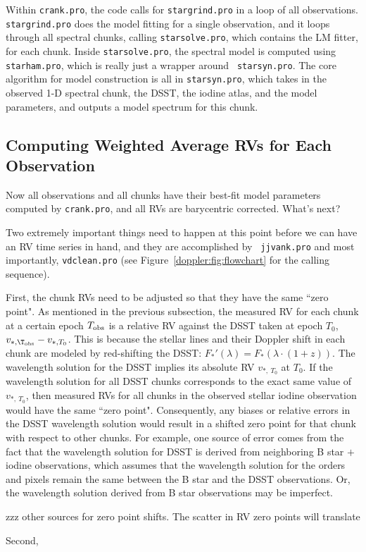 Within {\tt crank.pro}, the code calls for {\tt stargrind.pro} in a
loop of all observations. {\tt stargrind.pro} does the model fitting
for a single observation, and it loops through all spectral chunks,
calling {\tt starsolve.pro}, which contains the LM fitter, for each
chunk. Inside {\tt starsolve.pro}, the spectral model is computed
using {\tt starham.pro}, which is really just a wrapper around {\tt
  starsyn.pro}. The core algorithm for model construction is all in
{\tt starsyn.pro}, which takes in the observed 1-D spectral chunk, the
DSST, the iodine atlas, and the model parameters, and outputs a model
spectrum for this chunk. 



\subsection{Computing Weighted Average RVs for Each Observation}

Now all observations and all chunks have their best-fit model parameters
computed by {\tt crank.pro}, and all RVs are barycentric
corrected. What's next?

Two extremely important things need to happen at this point before we
can have an RV time series in hand, and they are accomplished by {\tt
  jjvank.pro} and most importantly, {\tt vdclean.pro} (see
Figure~\ref{doppler:fig:flowchart} for the calling sequence).

First, the chunk RVs need to be adjusted so that they have the same
``zero point". As mentioned in the previous subsection, the measured
RV for each chunk at a certain epoch $T_{\rm obs}$ is a relative RV
against the DSST taken at epoch $T_0$, $v_{*,\T_{\rm obs}} -
v_{*,T_0}$. This is because the stellar lines and their Doppler shift
in each chunk are modeled by red-shifting the DSST: $F_{*}'(\lambda) =
F_{*}(\lambda\cdot(1+z))$. The wavelength solution for the DSST
implies its absolute RV $v_{*,\ T_0}$ at $T_0$. If the wavelength
solution for all DSST chunks corresponds to the exact same value of
$v_{*,\ T_0}$, then measured RVs for all chunks in the observed
stellar iodine observation would have the same ``zero
point". Consequently, any biases or relative errors in the DSST
wavelength solution would result in a shifted zero point for that
chunk with respect to other chunks. For example, one source of error
comes from the fact that the wavelength solution for DSST is derived
from neighboring B star $+$ iodine observations, which assumes that
the wavelength solution for the orders and pixels remain the same
between the B star and the DSST observations. Or, the wavelength
solution derived from B star observations may be imperfect.

zzz other sources for zero point shifts. The scatter in RV zero points will translate 

Second, 

